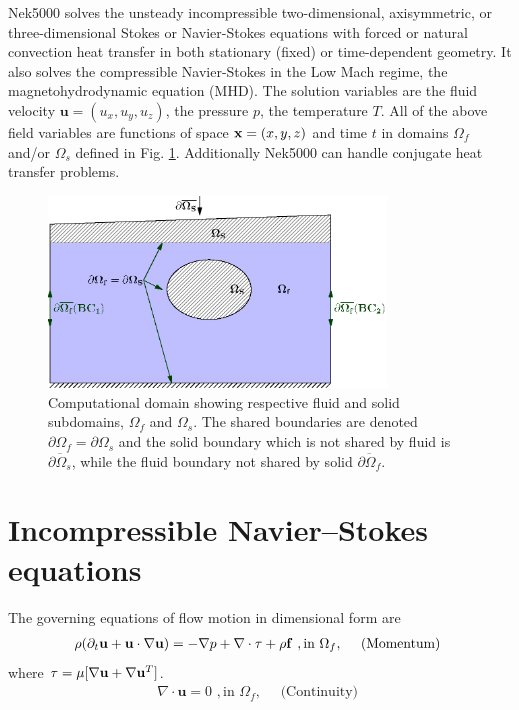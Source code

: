 Nek5000 solves the unsteady incompressible two-dimensional,
axisymmetric, or three-dimensional Stokes or Navier-Stokes
equations with forced or natural convection heat transfer in
both stationary (fixed) or time-dependent geometry. It also solves the compressible Navier-Stokes in the Low Mach regime, the magnetohydrodynamic equation (MHD).
The solution variables are the fluid velocity
\(\mathbf u=(u_{x},u_{y},u_{z})\), the pressure \(p\),
the temperature \(T\). 
All of the above field variables
are functions of space \({\bf x}=(x,y,z)\) and time \(t\)
in domains \(\Omega_f\) and/or \(\Omega_s\) defined in Fig. \ref{fig:domains}.
Additionally Nek5000 can handle conjugate heat transfer problems.

\begin{figure}
\centering
\includegraphics[width=0.8\textwidth]{Figs/walls}
\caption{Computational domain showing respective fluid
and solid subdomains, \(\Omega_f\) and \(\Omega_s\). The shared boundaries are denoted \(\partial\Omega_f=\partial\Omega_s\) and the solid boundary which is not shared by fluid is \(\overline{\partial\Omega_s}\), while the fluid boundary not shared by solid \(\overline{\partial\Omega_f}\).}
\label{fig:domains}
\end{figure}

\section{Incompressible Navier--Stokes equations}
%
The governing equations of flow motion in dimensional form are
\begin{eqnarray}\label{eq:ns_momentum}
\rho(\partial_{t} \mathbf u +\mathbf u \cdot \nabla \mathbf u) = - \nabla p + \nabla \cdot \tau + \rho {\bf f} \,\, , \text{in } \Omega_f , \quad \text{  (Momentum)  } 
\end{eqnarray}
where \( \tau=\mu[\nabla \mathbf{u}+\nabla \mathbf{u}^{T}]\).
\begin{eqnarray}\label{eq:ns_cont}
 \nabla \cdot \mathbf u =0 \,\, , \text{in } \Omega_f, \quad \text{  (Continuity)  }   
\end{eqnarray}

